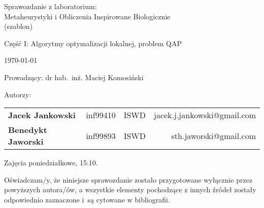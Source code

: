 \thispagestyle{empty} %

\begin{center}
{\large{Sprawozdanie z laboratorium:\\
Metaheurystyki i Obliczenia Inspirowane Biologicznie\\
(szablon)}}

\vspace{3ex}

Część I: Algorytmy optymalizacji lokalnej, problem QAP

\vspace{3ex}
{\footnotesize\today}

\end{center}


\vspace{10ex}

Prowadzący: dr hab.~inż. Maciej Komosiński

\vspace{5ex}

Autorzy:
\begin{tabular}{lllr}
\textbf{Jacek Jankowski} & inf99410 & ISWD & jacek.j.jankowski@gmail.com \\
\textbf{Benedykt Jaworski} & inf99893 & ISWD & sth.jaworski@gmail.com \\
\end{tabular}

\vspace{5ex}

Zajęcia poniedziałkowe, 15:10.

\vspace{35ex}

\noindent Oświadczam/y, że niniejsze sprawozdanie zostało przygotowane wyłącznie przez powyższych autora/ów,
a wszystkie elementy pochodzące z innych źródeł zostały odpowiednio zaznaczone i~są cytowane w bibliografii.  

\newpage

